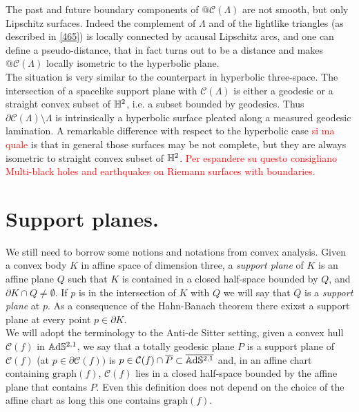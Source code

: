 \begin{observation}\label{467}
The past and future boundary components of $@\mathcal{C}(\Lambda)$ are not smooth, but only Lipschitz surfaces. Indeed the complement of $\Lambda$ and of the lightlike triangles (as described in \ref{465}) is locally connected by acausal Lipschitz arcs, and one can define a pseudo-distance, that in fact turns out to be a distance and makes $@\mathcal{C}(\Lambda)$ locally isometric to the hyperbolic plane. \\
The situation is very similar to the counterpart in hyperbolic three-space. The intersection of a spacelike support plane with $\mathcal{C}(\Lambda)$ is either a geodesic or a straight convex subset of $\mathbb{H}^2$, i.e. a subset bounded by geodesics. Thus $\partial\mathcal{C}(\Lambda)\setminus\Lambda$ is intrinsically a hyperbolic surface pleated along a measured geodesic lamination. A remarkable difference with respect to the hyperbolic case \textcolor{red}{si ma quale} is that in general those surfaces may be not complete, but they are always isometric to straight convex subset of $\mathbb{H}^2$. \textcolor{red}{Per espandere su questo consigliano Multi-black holes and earthquakes on Riemann surfaces with boundaries.}

\end{observation}

\section{Support planes.}\label{sectionplanes}
We still need to borrow some notions and notations from convex analysis. Given a convex body $K$ in affine space of dimension three, a \textit{support plane} of $K$ is an affine plane $Q$ such that $K$ is contained in a closed half-space bounded by $Q$, and $\partial K\cap Q\neq\emptyset.$ If $p$ is in the intersection of $K$ with $Q$ we will say that $Q$ is a \textit{support plane} at $p$. As a consequence of the Hahn-Banach theorem there exixst a support plane at every point $p\in\partial K.$ \\
We will adopt the terminology to the Anti-de Sitter setting, given a convex hull $\mathcal{C}(f)$ in $\mathbb{A}\mathrm{d}\mathbb{S}^{2,1}$, we say that a totally geodesic plane $P$ is a support plane of $\mathcal{C}(f)$ (at $p\in\partial\mathcal{C}(f))$ is $p\in\mathcal{C}(f)\cap \overline{P}\subset\overline{\mathbb{A}\mathrm{d}\mathbb{S}^{2,1}}$ and, in an affine chart containing $\text{graph}(f)$, $\mathcal{C}(f)$ lies in a closed half-space bounded by the affine plane that contains $P$. Even this definition does not depend on the choice of the affine chart as long this one contains $\text{graph}(f)$.\\ 

